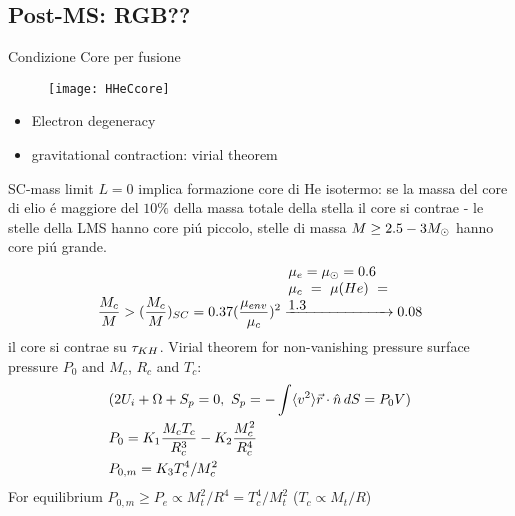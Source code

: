 \subsection{Post-MS: RGB??}

\begin{frame}{Condizione Core per fusione}
\begin{figure}[!ht]
\texttt{[image: HHeCcore]}\label{fig:HHeCcore}
\end{figure}
\begin{itemize}
    \item Electron degeneracy
    \item gravitational contraction: virial theorem
\end{itemize}
\end{frame}

\begin{frame}{SC-mass limit}
$L=0$ implica formazione core di He isotermo: se la massa del core di elio \'e maggiore del $10\%$ della massa totale della stella il core si contrae - le stelle della LMS hanno core pi\'u piccolo, stelle di massa $M\geq2.5-3M_{\odot}{}$  hanno core pi\'u grande.
\begin{equation*}
\frac{M_c}{M}>(\frac{M_c}{M})_{SC}=0.37(\frac{\mu_{env}}{\mu_c})^2\xrightarrow{\parbox{2.5cm}{$\mu_e=\mu_{\odot}=0.6$\\$\mu_c=\mu(He)=1.3$}}0.08
\end{equation*}
il core si contrae su $\tau_{KH}{}$.
Virial theorem for non-vanishing pressure surface pressure $P_0$ and $M_c$, $R_c$ and $T_c$:
\begin{align*}
&(2U_i+\Omega+S_p=0,\ S_p=-\int\exv{v^2}\Vec{r}\cdot\hat{n}\,dS=P_0V)\\
&P_0=K_1\frac{M_cT_c}{R_c^3}-K_2\frac{M_c^2}{R_c^4}\\
&P_{0,m}=K_3T_c^4/M_c^2
\end{align*}
For equilibrium $P_{0,m}\geq P_e\propto M_t^2/R^4=T_c^4/M_t^2$ ($T_c\propto M_t/R$)
\end{frame}


